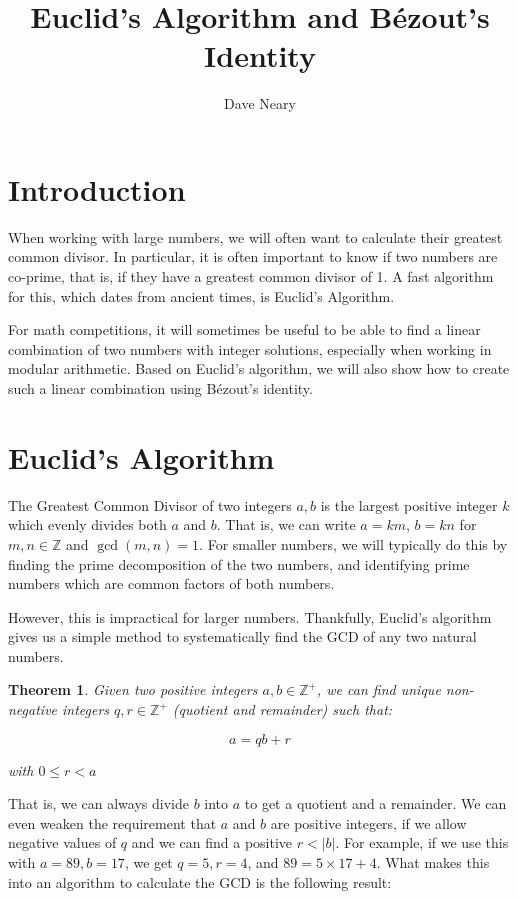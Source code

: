 \documentclass{article}
\newtheorem{theorem}{Theorem}
\begin{document}
\title{Euclid's Algorithm and B\'ezout's Identity}
\author{Dave Neary}

\maketitle

\section{Introduction}

When working with large numbers, we will often want to calculate their greatest common divisor.
In particular, it is often important to know if two numbers are co-prime, that is, if they have a
greatest common divisor of 1. A fast algorithm for this, which dates from ancient times, is
Euclid's Algorithm. 

For math competitions, it will sometimes be useful to be able to find a linear combination of two
numbers with integer solutions, especially when working in modular arithmetic. Based on Euclid's
algorithm, we will also show how to create such a linear combination using B\'ezout's identity.

\section{Euclid's Algorithm}

The Greatest Common Divisor of two integers $a,b$ is the largest positive integer $k$ which 
evenly divides both $a$ and $b$. That is, we can write $a=km$, $b=kn$ for $m,n \in \mathbb{Z}$ and 
$\gcd(m,n) = 1$. For smaller numbers, we will typically do this by finding the prime decomposition
of the two numbers, and identifying prime numbers which are common factors of both numbers.

However, this is impractical for larger numbers. Thankfully, Euclid's algorithm gives us a simple
method to systematically find the GCD of any two natural numbers.

\begin{theorem}
Given two positive integers $a,b \in \mathbb{Z}^+$, we can find unique non-negative integers 
$q,r \in \mathbb{Z}^+$ (quotient and remainder) such that:

\[ a = qb + r \]

with $0\leq r < a$
\end{theorem}

That is, we can always divide $b$ into $a$ to get a quotient and a remainder. We can even weaken the
requirement that $a$ and $b$ are positive integers, if we allow negative values of $q$ and we can find a
positive $r < |b|$. For example, if we use this with $a=89, b=17$, we get $q=5, r=4$, and 
$89 = 5 \times 17 + 4$. What makes this into an algorithm to calculate the GCD is the following result:
\end{document}
